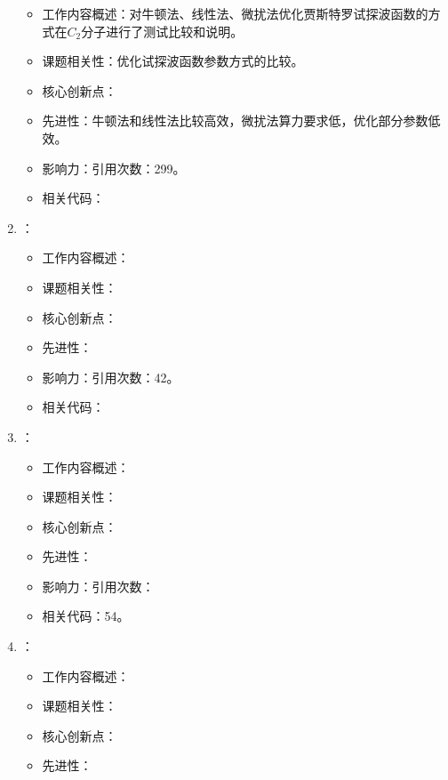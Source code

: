 \begin{enumerate}
            \begin{itemize}
                \item 工作内容概述：对牛顿法\citep{umrigar2005energy}、线性法\citep{umrigar2007alleviation}、微扰法\citep{scemama2006simple}优化贾斯特罗试探波函数的方式在$C_2$分子进行了测试比较和说明。
                \item 课题相关性：优化试探波函数参数方式的比较。
                \item 核心创新点：
                \item 先进性：牛顿法和线性法比较高效，微扰法算力要求低，优化部分参数低效。
                \item 影响力：引用次数：299。
                \item 相关代码：
            \end{itemize}
            \item \citet{nemec2010diffusion}：
            \begin{itemize}
                \item 工作内容概述：
                \item 课题相关性：
                \item 核心创新点：
                \item 先进性：
                \item 影响力：引用次数：42。
                \item 相关代码：
            \end{itemize}
            \item \citet{boninsegni2012population}：
            \begin{itemize}
                \item 工作内容概述：
                \item 课题相关性：
                \item 核心创新点：
                \item 先进性：
                \item 影响力：引用次数：
                \item 相关代码：54。
            \end{itemize}
            \item \citet{boixo2014evidence}：
            \begin{itemize}
                \item 工作内容概述：
                \item 课题相关性：
                \item 核心创新点：
                \item 先进性：

\end{itemize}
\end{enumerate}
